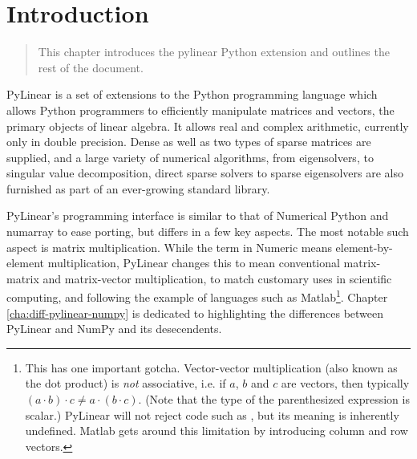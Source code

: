 \chapter{Introduction}
\label{cha:introduction}

\begin{quote}
   This chapter introduces the pylinear Python extension and outlines the rest
   of the document.
\end{quote}

PyLinear is a set of extensions to the Python programming language
which allows Python programmers to efficiently manipulate matrices and
vectors, the primary objects of linear algebra.  It allows real and
complex arithmetic, currently only in double precision.  Dense as well
as two types of sparse matrices are supplied, and a large variety of
numerical algorithms, from eigensolvers, to singular value
decomposition, direct sparse solvers to sparse eigensolvers are also
furnished as part of an ever-growing standard library.

PyLinear's programming interface is similar to that of Numerical
Python and numarray to ease porting, but differs in a few key
aspects. The most notable such aspect is matrix multiplication. While
the term  in Numeric means element-by-element
multiplication, PyLinear changes this to mean conventional
matrix-matrix and matrix-vector multiplication, to match customary
uses in scientific computing, and following the example of languages
such as Matlab\footnote{This has one important gotcha. Vector-vector
multiplication (also known as the dot product) is \emph{not}
associative, i.e. if $a$, $b$ and $c$ are vectors, then typically
$(a\cdot b)\cdot c\not=a\cdot(b\cdot c)$. (Note that the type of the
parenthesized expression is scalar.) PyLinear will not reject code
such as , but its meaning is inherently undefined. Matlab
gets around this limitation by introducing column and row vectors.}.
Chapter \ref{cha:diff-pylinear-numpy} is dedicated to highlighting the
differences between PyLinear and NumPy and its desecendents.

